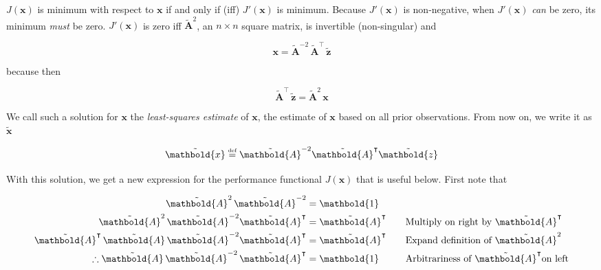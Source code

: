 \documentclass[10pt,oneside,x11names]{article}
\begin{document}
\noindent \(J(\mathbold{x})\) is minimum with respect to \(\mathbold{x}\) if and
only if (iff) \(J'(\mathbold{x})\) is minimum. Because \(J'(\mathbold{x})\) is
non-negative, when \(J'(\mathbold{x})\) \emph{can} be zero, its minimum \emph{must} be
zero. \(J'(\mathbold{x})\) is zero iff \({\tilde{\mathbold{A}}}^2\), an \(n\times{n}\)
square matrix, is invertible (non-singular) and

\begin{equation*}
\mathbold{x}=
{\tilde{\mathbold{A}}}^{-2}\,
{\tilde{\mathbold{A}}}^\intercal\,
{\tilde{\mathbold{z}}}
\end{equation*}

\noindent because then

\begin{equation*}
{\tilde{\mathbold{A}}}^\intercal\,
{\tilde{\mathbold{z}}}=
{\tilde{\mathbold{A}}}^2\,
\mathbold{x}
\end{equation*}

We call such a solution for \(\mathbold{x}\) the \emph{least-squares estimate} of
\(\mathbold{x}\), the estimate of
\(\mathbold{x}\) based on all prior observations.
From now on, we write it as \({\tilde{\mathbold{x}}}\)

\begin{equation}
\label{eqn:least-squares-estimate}
\tilde{\mathbold{x}}
\stackrel{\text{\tiny def}}{=}
{\tilde{\mathbold{A}}}^{-2}
{\tilde{\mathbold{A}}}^\intercal
{\tilde{\mathbold{z}}} 
\end{equation}

With this solution, we get a new expression for the performance functional
\(J(\mathbold{x})\) that is  useful below. First note that 

\begin{alignat}{6}
\notag
{\tilde{\mathbold{A}}}^2\,
{\tilde{\mathbold{A}}}^{-2}
&=
\mathbold{1}
&& \text{}
\\
\notag
{\tilde{\mathbold{A}}}^2\,
{\tilde{\mathbold{A}}}^{-2}
{\tilde{\mathbold{A}}}^\intercal
&=
{\tilde{\mathbold{A}}}^\intercal
&& 
\quad\text{Multiply on right by }\tilde{\mathbold{A}}^\intercal
\\
\notag
{\tilde{\mathbold{A}}}^\intercal\,
{\tilde{\mathbold{A}}}\,
{\tilde{\mathbold{A}}}^{-2}
{\tilde{\mathbold{A}}}^\intercal
&=
{\tilde{\mathbold{A}}}^\intercal
&&
\quad\text{Expand definition of }{\tilde{\mathbold{A}}}^2
\\
\label{eqn:aa2at-is-one}
\therefore
{\tilde{\mathbold{A}}}\,
{\tilde{\mathbold{A}}}^{-2}\,
{\tilde{\mathbold{A}}}^\intercal
&=
\mathbold{1}
&&
\quad\text{Arbitrariness of }\tilde{\mathbold{A}}^\intercal\text{on left}
\end{alignat}
\end{document}
